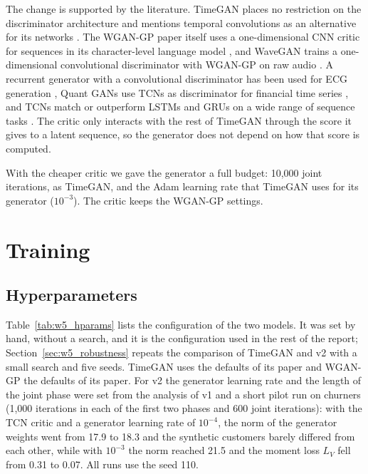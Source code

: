 \documentclass{article}
\begin{document}
The change is supported by the literature. TimeGAN places no restriction on the discriminator architecture and mentions temporal convolutions as an alternative for its networks \cite{yoon2019}. The WGAN-GP paper itself uses a one-dimensional CNN critic for sequences in its character-level language model \cite{gulrajani2017}, and WaveGAN trains a one-dimensional convolutional discriminator with WGAN-GP on raw audio \cite{donahue2019}. A recurrent generator with a convolutional discriminator has been used for ECG generation \cite{zhu2019}, Quant GANs use TCNs as discriminator for financial time series \cite{wiese2020}, and TCNs match or outperform LSTMs and GRUs on a wide range of sequence tasks \cite{bai2018}. The critic only interacts with the rest of TimeGAN through the score it gives to a latent sequence, so the generator does not depend on how that score is computed.

With the cheaper critic we gave the generator a full budget: 10{,}000 joint iterations, as TimeGAN, and the Adam learning rate that TimeGAN uses for its generator ($10^{-3}$). The critic keeps the WGAN-GP settings.

\section{Training}
\label{sec:w5_training}

\subsection{Hyperparameters}

Table~\ref{tab:w5_hparams} lists the configuration of the two models. It was set by hand, without a search, and it is the configuration used in the rest of the report; Section~\ref{sec:w5_robustness} repeats the comparison of TimeGAN and v2 with a small search and five seeds. TimeGAN uses the defaults of its paper and WGAN-GP the defaults of its paper. For v2 the generator learning rate and the length of the joint phase were set from the analysis of v1 and a short pilot run on churners (1{,}000 iterations in each of the first two phases and 600 joint iterations): with the TCN critic and a generator learning rate of $10^{-4}$, the norm of the generator weights went from 17.9 to 18.3 and the synthetic customers barely differed from each other, while with $10^{-3}$ the norm reached 21.5 and the moment loss $L_V$ fell from 0.31 to 0.07. All runs use the seed 110.
\end{document}
